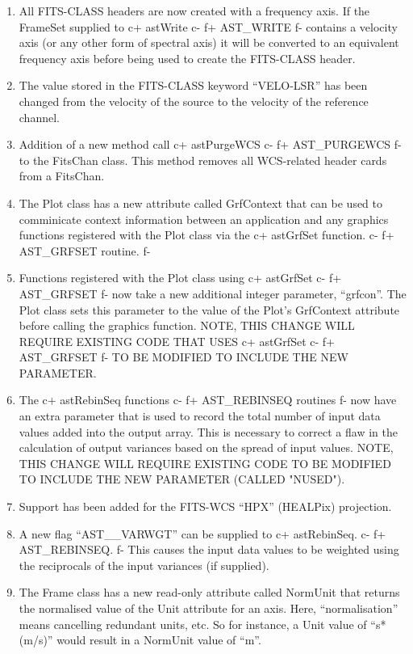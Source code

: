 \documentclass[twoside,11pt]{article}
\begin{document}
\begin{enumerate}



\item All FITS-CLASS headers are now created with a frequency axis. If the
FrameSet supplied to
c+
astWrite
c-
f+
AST\_WRITE
f-
contains a velocity axis (or any other form
of spectral axis) it will be converted to an equivalent frequency axis
before being used to create the FITS-CLASS header.

\item The value stored in the FITS-CLASS keyword ``VELO-LSR'' has been changed
from the velocity of the source to the velocity of the reference channel.

\item Addition of a new method call
c+
astPurgeWCS
c-
f+
AST\_PURGEWCS
f-
to the FitsChan
class. This method removes all WCS-related header cards from a FitsChan.

\item The Plot class has a new attribute called GrfContext that can be used
to comminicate context information between an application and any
graphics functions registered with the Plot class via the
c+
astGrfSet function.
c-
f+
AST\_GRFSET routine.
f-
\item Functions registered with the Plot class using
c+
astGrfSet
c-
f+
AST\_GRFSET
f-
now take a new additional integer parameter, ``grfcon''. The Plot class
sets this parameter to the value of the Plot's GrfContext attribute before
calling the graphics function. NOTE, THIS CHANGE WILL REQUIRE EXISTING
CODE THAT USES
c+
astGrfSet
c-
f+
AST\_GRFSET
f-
TO BE MODIFIED TO INCLUDE THE NEW PARAMETER.
\item The
c+
astRebinSeq functions
c-
f+
AST\_REBINSEQ routines
f-
now have an extra parameter that is used to record the total number of input
data values added into the output array. This is necessary to correct a
flaw in the calculation of output variances based on the spread of input
values. NOTE, THIS CHANGE WILL REQUIRE EXISTING CODE TO BE MODIFIED TO
INCLUDE THE NEW PARAMETER (CALLED "NUSED").
\item Support has been added for the FITS-WCS ``HPX'' (HEALPix) projection.
\item A new flag ``AST\_\_VARWGT'' can be supplied to
c+
astRebinSeq.
c-
f+
AST\_REBINSEQ.
f-
This causes the input data values to be weighted using the reciprocals of
the input variances (if supplied).

\item The Frame class has a new read-only attribute called NormUnit that
returns the normalised value of the Unit attribute for an axis. Here,
``normalisation'' means cancelling redundant units, etc. So for instance, a
Unit value of ``s*(m/s)'' would result in a NormUnit value of ``m''.


\end{enumerate}
\end{document}
